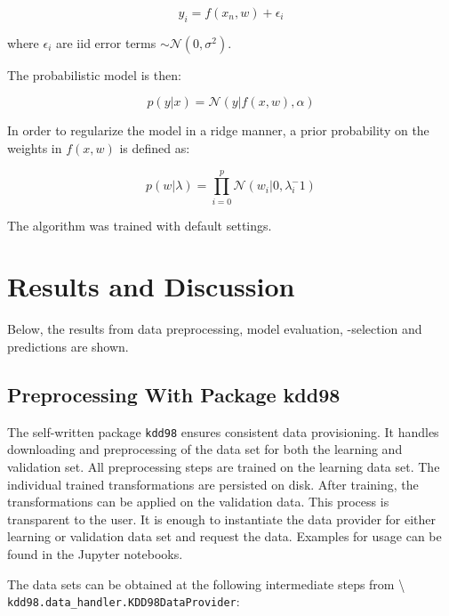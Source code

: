\documentclass[
  11pt,
  a4paper,
  DIV=12,captions=tableheading,oneside,titlepage]{scrbook}
\begin{document}
\begin{equation}
y_i = f(x_n, w) + \epsilon_i
\label{eq:bayesion-linear-model-sk}
\end{equation}

where \(\epsilon_i\) are iid error terms \(\sim \mathcal{N}(0, \sigma^2)\).

The probabilistic model is then:

\begin{equation}
p(y|x) =\mathcal{N}(y|f(x,w), \alpha)
\label{eq:bayesian-prob-model}
\end{equation}

In order to regularize the model in a ridge manner, a prior probability on the weights in \(f(x,w)\) is defined as:

\begin{equation}
p(w|\lambda) = \prod_{i=0}^p \mathcal{N}(w_i|0, \lambda_i^-1)
\label{eq:prior-alpha}
\end{equation}

The algorithm was trained with default settings.

\hypertarget{results-and-discussion}{%
\chapter{Results and Discussion}\label{results-and-discussion}}

Below, the results from data preprocessing, model evaluation, -selection and predictions are shown.

\hypertarget{preprocessing-with-package-kdd98}{%
\section{Preprocessing With Package kdd98}\label{preprocessing-with-package-kdd98}}

The self-written package \texttt{kdd98} ensures consistent data provisioning. It handles downloading and preprocessing of the data set for both the learning and validation set. All preprocessing steps are trained on the learning data set. The individual trained transformations are persisted on disk. After training, the transformations can be applied on the validation data. This process is transparent to the user. It is enough to instantiate the data provider for either learning or validation data set and request the data. Examples for usage can be found in the Jupyter notebooks.

The data sets can be obtained at the following intermediate steps from \textbackslash{} \texttt{kdd98.data\_handler.KDD98DataProvider}:
\end{document}
